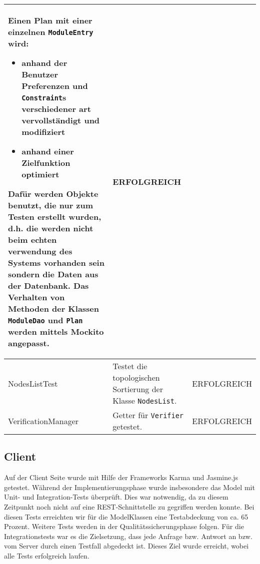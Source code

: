 \begin{longtable}{| >{\hspace{0pt}} p{} | >{\hspace{0pt}} p{} | >{\hspace{0pt}} p{} |}
	Einen Plan mit einer einzelnen \texttt{ModuleEntry} wird:
	\begin{itemize}
		\item anhand der Benutzer Preferenzen und \texttt{Constraint}s verschiedener art vervollständigt und modifiziert
		\item anhand einer Zielfunktion optimiert
	\end{itemize}
	Dafür werden Objekte benutzt, die nur zum Testen erstellt wurden, d.h. die werden nicht beim echten verwendung des Systems vorhanden sein sondern die Daten aus der Datenbank. Das Verhalten von Methoden der Klassen \texttt{ModuleDao} und \texttt{Plan} werden mittels Mockito angepasst. & ERFOLGREICH\\
	\hline
	NodesListTest & Testet die topologischen Sortierung der Klasse \texttt{NodesList}. & ERFOLGREICH\\
	\hline
	VerificationManager & Getter für \texttt{Verifier} getestet. & ERFOLGREICH\\
	\hline

\end{longtable}

\subsection{Client}
Auf der Client Seite wurde mit Hilfe der Frameworks Karma und Jasmine.js getestet.
Während der Implementierungsphase wurde insbesondere das Model mit Unit- und Integration-Tests überprüft.
Dies war notwendig, da zu diesem Zeitpunkt noch nicht auf eine REST-Schnittstelle zu gegriffen werden konnte.
Bei diesen Tests erreichten wir für die ModelKlassen eine Testabdeckung von ca. 65 Prozent. Weitere Tests werden in der Qualitätssicherungsphase folgen.
Für die Integrationstests war es die Zielsetzung, dass jede Anfrage bzw. Antwort an bzw. vom Server durch einen Testfall abgedeckt ist.
Dieses Ziel wurde erreicht, wobei alle Tests erfolgreich laufen.

